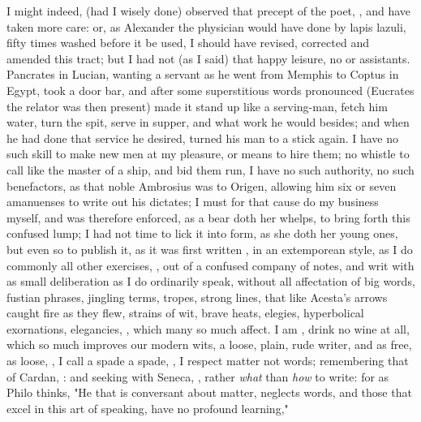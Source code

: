 I might indeed, (had I wisely done) observed that precept of the poet,
, and have taken more care: or, as
Alexander the physician would have done by lapis lazuli, fifty times washed
before it be used, I should have revised, corrected and amended this tract; but
I had not (as I said) that happy leisure, no  or assistants. Pancrates in Lucian,
wanting a servant as he went from Memphis to Coptus in Egypt, took a door bar,
and after some superstitious words pronounced (Eucrates the relator was then
present) made it stand up like a serving-man, fetch him water, turn the spit,
serve in supper, and what work he would besides; and when he had done that
service he desired, turned his man to a stick again. I have no such skill to
make new men at my pleasure, or means to hire them; no whistle to call like the
master of a ship, and bid them run, \etc{} I have no such authority, no such
benefactors, as that noble Ambrosius was to Origen,
allowing him six or seven amanuenses to write out his dictates; I must for that
cause do my business myself, and was therefore enforced, as a bear doth her
whelps, to bring forth this confused lump; I had not time to lick it into form,
as she doth her young ones, but even so to publish it, as it was first written
, in an extemporean style, as
I do commonly all other exercises, , out of a confused company of notes, and writ with as
small deliberation as I do ordinarily speak, without all affectation of big
words, fustian phrases, jingling terms, tropes, strong lines, that like
Acesta's arrows caught fire as they flew, strains of wit,
brave heats, elegies, hyperbolical exornations, elegancies, \etc{}, which many
so much affect. I am , drink no wine at
all, which so much improves our modern wits, a loose, plain, rude writer,
 and as free, as loose, , I call a spade a spade, , I respect matter not words; remembering that of
Cardan, : and seeking with Seneca,
, rather \emph{what} than \emph{how} to
write: for as Philo thinks, "He that is conversant about
matter, neglects words, and those that excel in this art of speaking, have no
profound learning,"

